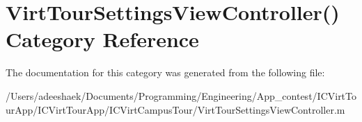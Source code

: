 \hypertarget{category_virt_tour_settings_view_controller_07_08}{\section{Virt\-Tour\-Settings\-View\-Controller() Category Reference}
\label{category_virt_tour_settings_view_controller_07_08}
}


The documentation for this category was generated from the following file\-:\begin{DoxyCompactItemize}
\item 
/\-Users/adeeshaek/\-Documents/\-Programming/\-Engineering/\-App\-\_\-contest/\-I\-C\-Virt\-Tour\-App/\-I\-C\-Virt\-Tour\-App/\-I\-C\-Virt\-Campus\-Tour/Virt\-Tour\-Settings\-View\-Controller.\-m\end{DoxyCompactItemize}
